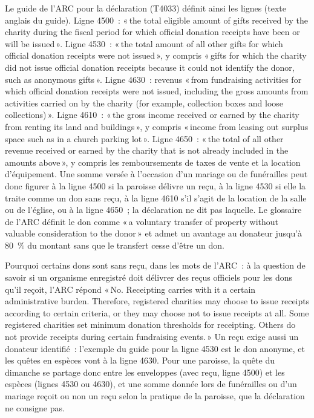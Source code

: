 \documentclass[11pt,letterpaper]{article}
\begin{document}
Le guide de l'ARC pour la déclaration (T4033) définit ainsi les lignes (texte anglais du guide). Ligne 4500~: «\,the total eligible amount of gifts received by the charity during the fiscal period for which official donation receipts have been or will be issued\,». Ligne 4530~: «\,the total amount of all other gifts for which official donation receipts were not issued\,», y compris «\,gifts for which the charity did not issue official donation receipts because it could not identify the donor, such as anonymous gifts\,». Ligne 4630~: revenus «\,from fundraising activities for which official donation receipts were not issued, including the gross amounts from activities carried on by the charity (for example, collection boxes and loose collections)\,». Ligne 4610~: «\,the gross income received or earned by the charity from renting its land and buildings\,», y compris «\,income from leasing out surplus space such as in a church parking lot\,». Ligne 4650~: «\,the total of all other revenue received or earned by the charity that is not already included in the amounts above\,», y compris les remboursements de taxes de vente et la location d'équipement. Une somme versée à l'occasion d'un mariage ou de funérailles peut donc figurer à la ligne 4500 si la paroisse délivre un reçu, à la ligne 4530 si elle la traite comme un don sans reçu, à la ligne 4610 s'il s'agit de la location de la salle ou de l'église, ou à la ligne 4650~; la déclaration ne dit pas laquelle. Le glossaire de l'ARC définit le don comme «\,a voluntary transfer of property without valuable consideration to the donor\,» et admet un avantage au donateur jusqu'à 80~\% du montant sans que le transfert cesse d'être un don.

Pourquoi certains dons sont sans reçu, dans les mots de l'ARC~: à la question de savoir si un organisme enregistré doit délivrer des reçus officiels pour les dons qu'il reçoit, l'ARC répond «\,No. Receipting carries with it a certain administrative burden. Therefore, registered charities may choose to issue receipts according to certain criteria, or they may choose not to issue receipts at all. Some registered charities set minimum donation thresholds for receipting. Others do not provide receipts during certain fundraising events.\,» Un reçu exige aussi un donateur identifié~: l'exemple du guide pour la ligne 4530 est le don anonyme, et les quêtes en espèces vont à la ligne 4630. Pour une paroisse, la quête du dimanche se partage donc entre les enveloppes (avec reçu, ligne 4500) et les espèces (lignes 4530 ou 4630), et une somme donnée lors de funérailles ou d'un mariage reçoit ou non un reçu selon la pratique de la paroisse, que la déclaration ne consigne pas.
\end{document}
